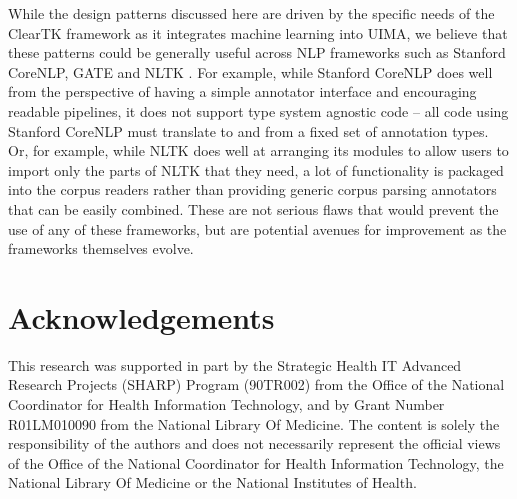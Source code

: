 \documentclass[10pt, a4paper]{article}
\begin{document}
While the design patterns discussed here are driven by the specific needs of the ClearTK framework as it integrates machine learning into UIMA, we believe that these patterns could be generally useful across NLP frameworks such as Stanford CoreNLP, GATE and NLTK \cite{BirdKleinLoper09}.
For example, while Stanford CoreNLP does well from the perspective of having a simple annotator interface and encouraging readable pipelines, it does not support type system agnostic code -- all code using Stanford CoreNLP must translate to and from a fixed set of annotation types.
Or, for example, while NLTK does well at arranging its modules to allow users to import only the parts of NLTK that they need, a lot of functionality is packaged into the corpus readers rather than providing generic corpus parsing annotators that can be easily combined.
These are not serious flaws that would prevent the use of any of these frameworks, but are potential avenues for improvement as the frameworks themselves evolve.

\section{Acknowledgements}
This research was supported in part by the Strategic Health IT Advanced Research Projects (SHARP) Program (90TR002) from the Office of the National Coordinator for Health Information Technology, and by Grant Number R01LM010090 from the National Library Of Medicine. The content is solely the responsibility of the authors and does not necessarily represent the official views of the Office of the National Coordinator for Health Information Technology, the National Library Of Medicine or the National Institutes of Health.



\end{document}
